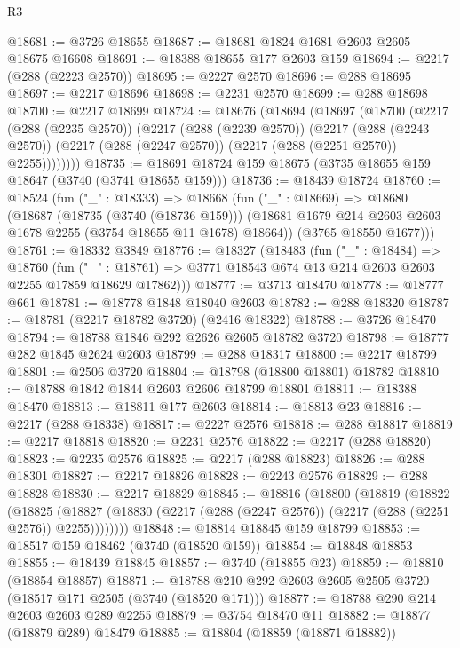 \begin{lexlean}{R3}
\begin{coremodule}
@18681 := @3726 @18655
@18687 := @18681 @1824 @1681 @2603 @2605 @18675 @16608
@18691 := @18388 @18655 @177 @2603 @159
@18694 := @2217 (@288 (@2223 @2570))
@18695 := @2227 @2570
@18696 := @288 @18695
@18697 := @2217 @18696
@18698 := @2231 @2570
@18699 := @288 @18698
@18700 := @2217 @18699
@18724 := @18676
    (@18694
      (@18697
        (@18700
          (@2217
            (@288 (@2235 @2570))
            (@2217
              (@288 (@2239 @2570))
              (@2217
                (@288 (@2243 @2570))
                (@2217 (@288 (@2247 @2570)) (@2217 (@288 (@2251 @2570)) @2255))))))))
@18735 := @18691 @18724 @159 @18675 (@3735 @18655 @159 @18647 (@3740 (@3741 @18655 @159)))
@18736 := @18439 @18724
@18760 := @18524
    (fun ("_" : @18333) =>
    @18668
      (fun ("_" : @18669) =>
      @18680
        (@18687
          (@18735 (@3740 (@18736 @159)))
          (@18681 @1679 @214 @2603 @2603 @1678 @2255 (@3754 @18655 @11 @1678) @18664))
        (@3765 @18550 @1677)))
@18761 := @18332 @3849
@18776 := @18327
    (@18483
      (fun ("_" : @18484) =>
      @18760
        (fun ("_" : @18761) => @3771 @18543 @674 @13 @214 @2603 @2603 @2255 @17859 @18629 @17862)))
@18777 := @3713 @18470
@18778 := @18777 @661
@18781 := @18778 @1848 @18040 @2603
@18782 := @288 @18320
@18787 := @18781 (@2217 @18782 @3720) (@2416 @18322)
@18788 := @3726 @18470
@18794 := @18788 @1846 @292 @2626 @2605 @18782 @3720
@18798 := @18777 @282 @1845 @2624 @2603
@18799 := @288 @18317
@18800 := @2217 @18799
@18801 := @2506 @3720
@18804 := @18798 (@18800 @18801) @18782
@18810 := @18788 @1842 @1844 @2603 @2606 @18799 @18801
@18811 := @18388 @18470
@18813 := @18811 @177 @2603
@18814 := @18813 @23
@18816 := @2217 (@288 @18338)
@18817 := @2227 @2576
@18818 := @288 @18817
@18819 := @2217 @18818
@18820 := @2231 @2576
@18822 := @2217 (@288 @18820)
@18823 := @2235 @2576
@18825 := @2217 (@288 @18823)
@18826 := @288 @18301
@18827 := @2217 @18826
@18828 := @2243 @2576
@18829 := @288 @18828
@18830 := @2217 @18829
@18845 := @18816
    (@18800
      (@18819
        (@18822
          (@18825
            (@18827 (@18830 (@2217 (@288 (@2247 @2576)) (@2217 (@288 (@2251 @2576)) @2255))))))))
@18848 := @18814 @18845 @159 @18799
@18853 := @18517 @159 @18462 (@3740 (@18520 @159))
@18854 := @18848 @18853
@18855 := @18439 @18845
@18857 := @3740 (@18855 @23)
@18859 := @18810 (@18854 @18857)
@18871 := @18788 @210 @292 @2603 @2605 @2505 @3720 (@18517 @171 @2505 (@3740 (@18520 @171)))
@18877 := @18788 @290 @214 @2603 @2603 @289 @2255
@18879 := @3754 @18470 @11
@18882 := @18877 (@18879 @289) @18479
@18885 := @18804 (@18859 (@18871 @18882))

\end{coremodule}
\end{lexlean}
